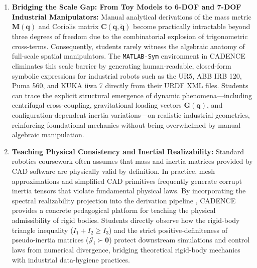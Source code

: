 \documentclass[fleqn,10pt]{article}
\begin{document}
\begin{enumerate} 
	\item \textbf{Bridging the Scale Gap: From Toy Models to 6-DOF and 7-DOF Industrial Manipulators:} 
	Manual analytical derivations of the mass metric $\bm{M}(\bm{q})$ and Coriolis matrix $\bm{C}(\bm{q},\dot{\bm{q}})$ become practically intractable beyond three degrees of freedom due to the combinatorial explosion of trigonometric cross-terms. Consequently, students rarely witness the algebraic anatomy of full-scale spatial manipulators. The \texttt{MATLAB-Sym} environment in CADENCE eliminates this scale barrier by generating human-readable, closed-form symbolic expressions for industrial robots such as the UR5, ABB IRB 120, Puma 560, and KUKA iiwa 7 directly from their URDF XML files. Students can trace the explicit structural emergence of dynamic phenomena---including centrifugal cross-coupling, gravitational loading vectors $\bm{G}(\bm{q})$, and configuration-dependent inertia variations---on realistic industrial geometries, reinforcing foundational mechanics without being overwhelmed by manual algebraic manipulation.
	
	\item \textbf{Teaching Physical Consistency and Inertial Realizability:} 
	Standard robotics coursework often assumes that mass and inertia matrices provided by CAD software are physically valid by definition. In practice, mesh approximations and simplified CAD primitives frequently generate corrupt inertia tensors that violate fundamental physical laws. By incorporating the spectral realizability projection into the derivation pipeline \cite{sousa2019physical, wensing2018linear, lee2020geometric}, CADENCE provides a concrete pedagogical platform for teaching the physical admissibility of rigid bodies. Students directly observe how the rigid-body triangle inequality ($I_1 + I_2 \ge I_3$) and the strict positive-definiteness of pseudo-inertia matrices ($\bm{\mathcal{J}}_i \succ \bm{0}$) protect downstream simulations and control laws from numerical divergence, bridging theoretical rigid-body mechanics with industrial data-hygiene practices.


\end{enumerate}
\end{document}
